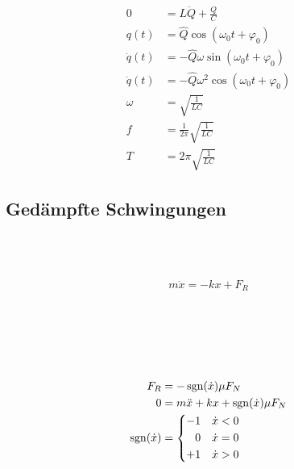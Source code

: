 \begin{boxleft}
\\
\\
\\
\end{boxleft}\begin{boxrightshaded}
\begin{align*}
0&=L\ddot{Q}+\frac{Q}{C}\\
q(t)&=\hat{Q}\cos(\omega_0 t+\varphi_0)\\
\dot{q}(t)&=-\hat{Q}\omega\sin(\omega_0 t+\varphi_0)\\
\ddot{q}(t)&=-\hat{Q}\omega^2\cos(\omega_0 t+\varphi_0)\\
\omega&=\sqrt{\frac{1}{LC}}\\
f&=\frac{1}{2\pi}\sqrt{\frac{1}{LC}}\\
T&=2\pi\sqrt{\frac{1}{LC}}
\end{align*}
\end{boxrightshaded}

\subsection{Gedämpfte Schwingungen}

\begin{boxleft}
\\
\\
\end{boxleft}\begin{boxrightshaded}
\begin{align*}
m\ddot{x}=-kx+F_R
\end{align*}
\end{boxrightshaded}

\begin{boxleft}
\\
\\
\\
\\
\end{boxleft}\begin{boxrightshaded}
\begin{align*}
F_R&=-\operatorname{sgn}({\dot{x}})\mu F_N\\
0&=m\ddot{x}+kx+\operatorname{sgn}({\dot{x}})\mu F_N\\
\operatorname{sgn}({\dot{x}})&=
\begin{dcases*}
  -1&$\dot{x}<0$\\
\phantom{+}0& $\dot{x}=0$\\
  +1&$\dot{x}>0$
\end{dcases*}
\end{align*}
\end{boxrightshaded}

